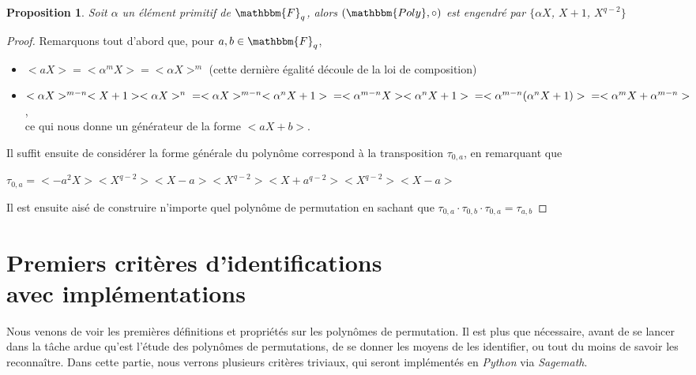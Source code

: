 \documentclass[12pt]{article}
\newcommand{\Fq}{\mathbbm{F}_q}
\newtheorem{prop}{Proposition}
\theoremstyle{definition}
\begin{document}
\begin{prop}
Soit $\alpha$ un élément primitif de $\Fq$, alors $(\mathbbm{Poly}, \circ)$ est engendré par $\{ \alpha X$, $X+1$, $X^{q-2}\}$
\end{prop}

\begin{proof}
Remarquons tout d'abord que, pour $a, b \in \Fq$, 
	\begin{itemize}
		\item $<aX> = <\alpha^mX> = <\alpha X>^m$ (cette dernière égalité découle de la loi de composition)
		\item $<\alpha X>^{m-n}<X+1><\alpha X>^n \newline
		= <\alpha X>^{m-n}<\alpha^nX + 1> \newline
		= <\alpha^{m-n} X ><\alpha^n X+ 1> \newline
		= <\alpha^{m-n}(\alpha^n X+ 1)> \newline
		= <\alpha^mX+\alpha^{m-n}>$,\\
ce qui nous donne un générateur de la forme $<aX + b>$.
	\end{itemize}
Il suffit ensuite de considérer la forme générale du polynôme correspond à la transposition $\tau_{0,a}$, en remarquant que 
\begin{center} $\tau_{0,a} = <-a^2X><X^{q-2}><X-a><X^{q-2}><X+a^{q-2}><X^{q-2}><X-a>$ \end{center}
Il est ensuite aisé de construire n'importe quel polynôme de permutation en sachant que $\tau_{0,a} \cdot \tau_{0,b} \cdot \tau_{0,a} = \tau_{a,b}$
\end{proof}


\pagebreak

\section{Premiers critères d'identifications\\avec implémentations}
Nous venons de voir les premières définitions et propriétés sur les polynômes de permutation. Il est plus que nécessaire, avant de se lancer dans la tâche ardue qu'est l'étude des polynômes de permutations, de se donner les moyens de les identifier, ou tout du moins de savoir les reconnaître. 
Dans cette partie, nous verrons plusieurs critères triviaux, qui seront implémentés en \textit{Python} via \textit{Sagemath}.
\end{document}
